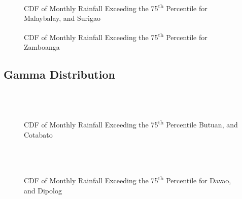 \begin{figure}[H]
  \centering
  \\
  \\
\caption{CDF of Monthly Rainfall Exceeding the 75\textsuperscript{th} Percentile for Malaybalay, and Surigao}
  \label{fig:monthly_0.75_appendix_gb_pt5}
\end{figure}

\begin{figure}[H]
  \centering
  \caption{CDF of Monthly Rainfall Exceeding the 75\textsuperscript{th} Percentile for Zamboanga}
  \label{fig:monthly_0.75_appendix_gb_pt6}
\end{figure}


\subsection{Gamma Distribution}

\begin{figure}[H]
  \centering
  \\
  \\
\caption{CDF of Monthly Rainfall Exceeding the 75\textsuperscript{th} Percentile Butuan, and Cotabato}
\label{fig:monthly_0.75_appendix_gamma_pt1}
\end{figure}

\begin{figure}[H]
  \centering
  \\
  \\
\caption{CDF of Monthly Rainfall Exceeding the 75\textsuperscript{th} Percentile for Davao, and Dipolog}
\label{fig:monthly_0.75_appendix_gamma_pt2}
\end{figure}

